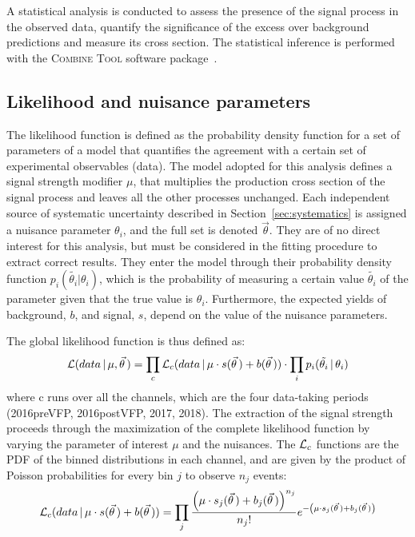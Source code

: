 \label{sec:statistical_analysis}
A statistical analysis is conducted to assess the presence of the signal process in the observed data,
quantify the significance of the excess over background predictions and measure its cross section.
The statistical inference is performed with the \textsc{Combine Tool} software package~\cite{CMS-NOTE-2011-005,CMS-CAT-23-001}.

\providecommand{\poissonpdf}[2]{\ensuremath{ \frac{{#1}^{#2}}{#2!}e^{-#1} }}

\subsection{Likelihood and nuisance parameters}
The likelihood function is defined as the probability density function for a set of parameters of a model
that quantifies the agreement with a certain set of experimental observables (data).
The model adopted for this analysis defines a signal strength modifier $\mu$,
that multiplies the production cross section of the signal process and leaves all the other processes unchanged.
Each independent source of systematic uncertainty described in Section~\ref{sec:systematics} is assigned a nuisance parameter $\theta_i$, and the full set is denoted $\vec\theta$.
They are of no direct interest for this analysis, but must be considered in the fitting procedure to extract correct results.
They enter the model through their probability density function $p_i(\tilde{\theta_i}|\theta_i)$,
which is the probability of measuring a certain value $\tilde{\theta_i}$ of the parameter given that the true value is $\theta_i$.
Furthermore, the expected yields of background, $b$, and signal, $s$, depend on the value of the nuisance parameters.

The global likelihood function is thus defined as:
\begin{equation}
  \label{eq:likelihood_full}
  \mathcal{L}(data\, |\, \mu, \vec\theta\,) = \prod_c \mathcal{L}_c(data\, |\, \mu \cdot s(\vec\theta\,) + b(\vec\theta\,)) \cdot \prod_i p_i(\tilde{\theta_i}\, |\, \theta_i)
\end{equation}
where c runs over all the channels, which are the four data-taking periods (2016preVFP, 2016postVFP, 2017, 2018).
The extraction of the signal strength proceeds through the maximization of the complete likelihood function by varying the parameter of interest $\mu$ and the nuisances.
The $\mathcal{L}_c$ functions are the PDF of the binned distributions in each channel, and are given by the product of Poisson probabilities for every bin $j$ to observe $n_j$ events:
\begin{equation}
  \label{eq:likelihood_bin}
  \Likelihood_c(data\, |\, \mu \cdot s(\vec\theta\,) + b(\vec\theta\,)) =
                       \prod_j \poissonpdf{\left( \mu \cdot s_j(\vec\theta\,) + b_j(\vec\theta\,) \right)}{n_j}
\end{equation}

